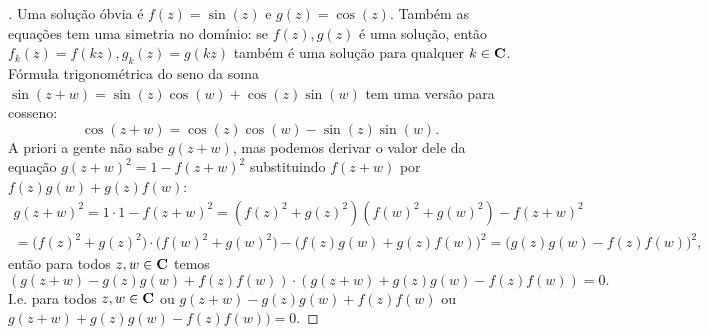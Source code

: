 \begin{proof}[]

Uma solução óbvia é $f(z) = \sin(z)$ e $g(z) =\cos(z)$.
Também as equações tem uma simetria no domínio:
se $f(z),g(z)$ é uma solução, então $f_k(z) = f(kz), g_k(z) = g(kz)$
também é uma solução para qualquer $k\in\mathbf{C}$.
Fórmula trigonométrica do seno da soma
$\sin(z+w) = \sin(z) \cos(w) + \cos(z) \sin(w)$
tem uma versão para cosseno:
\[ \cos(z+w) = \cos(z)\cos(w) - \sin(z)\sin(w). \]
A priori a gente não sabe $g(z+w)$, mas podemos derivar o valor dele
da equação $g(z+w)^2 = 1 - f(z+w)^2$ substituindo $f(z+w)$
por $f(z)g(w)+g(z)f(w)$:
\begin{multline*}
g(z+w)^2 = 1\cdot 1 - f(z+w)^2 = (f(z)^2+g(z)^2)(f(w)^2+g(w)^2) - f(z+w)^2
\\ = \big(f(z)^2+g(z)^2\big)\cdot\big(f(w)^2+g(w)^2\big) - \big(f(z)g(w)+g(z)f(w)\big)^2
   = \big(g(z)g(w)-f(z)f(w)\big)^2,
\end{multline*}
então para todos $z,w\in\mathbf{C}$ temos
\[ (g(z+w)-g(z)g(w)+f(z)f(w)) \cdot (g(z+w) + g(z)g(w)-f(z)f(w)) = 0. \]
I.e. para todos $z,w\in\mathbf{C}$ ou
$g(z+w)-g(z)g(w)+f(z)f(w)$ ou $g(z+w) + g(z)g(w)-f(z)f(w)) = 0$.

\end{proof}
